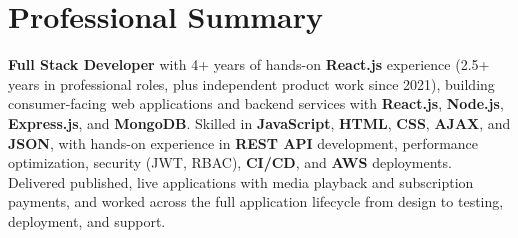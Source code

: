 \section{Professional Summary}
\vspace{2pt}

\textbf{Full Stack Developer} with 4+ years of hands-on \textbf{React.js} experience (2.5+ years in professional roles, plus independent product work since 2021), building consumer-facing web applications and backend services with \textbf{React.js}, \textbf{Node.js}, \textbf{Express.js}, and \textbf{MongoDB}. Skilled in \textbf{JavaScript}, \textbf{HTML}, \textbf{CSS}, \textbf{AJAX}, and \textbf{JSON}, with hands-on experience in \textbf{REST API} development, performance optimization, security (JWT, RBAC), \textbf{CI/CD}, and \textbf{AWS} deployments. Delivered published, live applications with media playback and subscription payments, and worked across the full application lifecycle from design to testing, deployment, and support.
